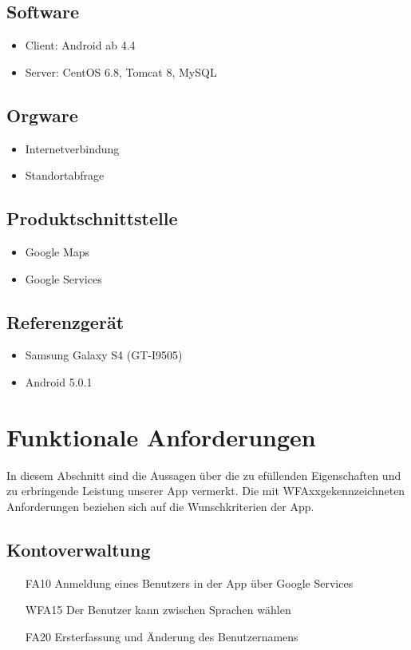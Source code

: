 \documentclass{scrartcl}
\begin{document}
	\subsection{Software}
	\begin{itemize}	        
		\item \gls{Client}: \gls{Android} ab 4.4
		\item \gls{Server}: CentOS 6.8, \gls{Tomcat} 8, MySQL
	\end{itemize}	
	\subsection{Orgware}
	\begin{itemize}	        
		\item Internetverbindung
		\item Standortabfrage
	\end{itemize}
	\subsection{Produktschnittstelle}
	\begin{itemize}	        
		\item Google Maps
		\item Google Services
	\end{itemize}
	\subsection{Referenzgerät}
	\begin{itemize}
		\item Samsung Galaxy S4 (GT-I9505)
		\item \gls{Android} 5.0.1
	\end{itemize}
	\newpage
	
	
	\section{Funktionale Anforderungen}
	 In diesem Abschnitt sind die Aussagen über die zu efüllenden Eigenschaften und zu erbringende Leistung unserer App vermerkt. Die mit \glqq WFAxx\grqq gekennzeichneten Anforderungen beziehen sich auf die Wunschkriterien der App.
	 
	\subsection{Kontoverwaltung}
	\begin{itemize}
		\item[FA10] Anmeldung eines Benutzers in der App über \gls{Google Services}
		\item[WFA15] Der Benutzer kann zwischen Sprachen wählen
		\item[FA20] Ersterfassung und Änderung des Benutzernamens
		
	\end{itemize}
	
\end{document}
